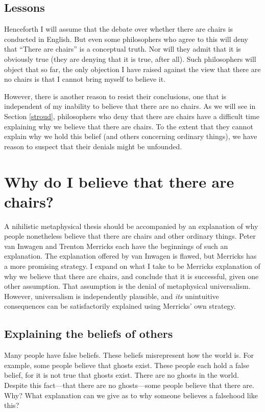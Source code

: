 \documentclass[12pt,twoside]{reedfancy}
\begin{document}
\begin{spacing}{1.25}
\section{Lessons}
\label{lessons-verb}
Henceforth I will assume that the debate over whether there are chairs
is conducted in English.  But even some philosophers who agree to this
will deny that ``There are chairs'' is a conceptual truth.  Nor will
they admit that it is obviously true (they are denying that it is
true, after all).  Such philosophers will object that so far, the only
objection I have raised against the view that there are no chairs is
that I cannot bring myself to believe it.

However, there is another reason to resist their conclusions, one that
is independent of my inability to believe that there are no chairs.
As we will see in Section \ref{stroud}, philosophers who deny that
there are chairs have a difficult time explaining why we believe that
there are chairs.  To the extent that they cannot explain why we hold
this belief (and others concerning ordinary things), we have reason to
suspect that their denials might be unfounded.


\chapter{Why do I believe that there are chairs?}
\label{stroud}

A nihilistic metaphysical thesis should be accompanied by an
explanation of why people nonetheless believe that there are chairs
and other ordinary things.  Peter van Inwagen and Trenton Merricks
each have the beginnings of such an explanation.  The explanation
offered by van Inwagen is flawed, but Merricks has a more promising
strategy.  I expand on what I take to be Merricks explanation of why
we believe that there are chairs, and conclude that it is successful,
given one other assumption.  That assumption is the denial of
metaphysical universalism.  However, universalism is independently
plausible, and {\em its} unintuitive consequences can be
satisfactorily explained using Merricks' own strategy.

\section{Explaining the beliefs of others}
\label{intro-beliefs}
\noindent Many people have false beliefs.  These beliefs misrepresent
how the world is.  For example, some people believe that ghosts exist.
These people each hold a false belief, for it is not true that ghosts
exist.  There are no ghosts in the world.  Despite this fact---that
there are no ghosts---some people believe that there are.  Why?  What
explanation can we give as to why someone believes a falsehood like
this?


\end{spacing}
\end{document}
